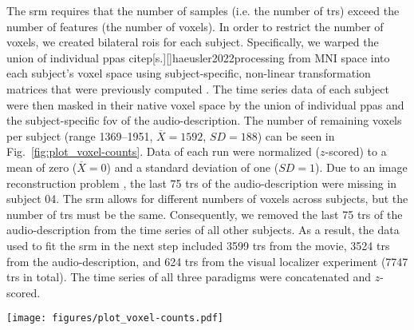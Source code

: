 
The \ac{srm} requires that the number of samples (i.e. the number of \acp{tr})
exceed the number of features (the number of voxels).
%
In order to restrict the number of voxels, we created bilateral \acp{roi} for
each subject.
%
Specifically, we warped the union of individual \acp{ppa}
citep[s.][]{haeusler2022processing} from MNI space into each subject's voxel
space using subject-specific, non-linear transformation matrices that were
previously computed
\citep[][\href{https://github.com/psychoinformatics-de/studyforrest-data-templatetransforms
}{\url{github.com/psychoinformatics-de/studyforrest-data-templatetransforms}}]{hanke2014audiomovie}.
The time series data of each subject were then masked in their native voxel
space by the union of individual \acp{ppa} and the subject-specific \ac{fov} of
the audio-description.
The number of remaining voxels per subject (range 1369--1951,
$\overline{X}=1592$, $SD=188$) can be seen in Fig.~\ref{fig:plot_voxel-counts}.
Data of each run were normalized ($z$-scored) to a mean of zero
($\overline{X}=0$) and a standard deviation of one ($SD=1$).
%
Due to an image reconstruction problem \citep[cf.][]{hanke2014audiomovie}, the
last 75 \acp{tr} of the audio-description were missing in subject 04.
%
The \ac{srm} allows for different numbers of voxels across subjects, but the
number of \acp{tr} must be the same.
%
Consequently, we removed the last 75 \acp{tr} of the audio-description from the
time series of all other subjects.
As a result, the data used to fit the \ac{srm} in the next step included 3599
\acp{tr} from the movie, 3524 \acp{tr} from the audio-description, and 624
\acp{tr} from the visual localizer experiment (7747 \acp{tr} in total).
The time series of all three paradigms were concatenated and $z$-scored.

\begin{figure*}[tbp]
\centering
\texttt{[image: figures/plot\_voxel-counts.pdf]}
\caption{
%
\textbf{Number of voxels in the bilateral regions of interest (ROIs)
of each subject.}
%
In order to reduce the number of voxels, we warped the union of
individual \acp{ppa} \citep[cf. Fig. 1 in][]{haeusler2022processing} from
MNI152 space into each subject's native voxel space.
%
The remaining voxels of each subject were further constrained to those
voxels that are included in the respective subject's \ac{fov} of the
audio-description \citep[cf.][]{hanke2014audiomovie}.
}
\label{fig:plot_voxel-counts}
\end{figure*}


